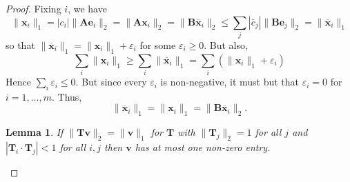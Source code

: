 \documentclass[journal, onecolumn]{IEEEtran}
\newtheorem{lemma}{Lemma}
\begin{document}
\begin{proof}
Fixing $i$, we have
\begin{equation}
\|\mathbf{x}_i\|_1 = |c_i| \|\mathbf{Ae}_i\|_2 = \|\mathbf{Ax}_i\|_2 = \|\mathbf{B \overline x}_i\|_2 \leq \sum_j |\bar c_j| \|\mathbf{Be}_j\|_2 = \|\mathbf{\overline x}_i\|_1
\end{equation}
so that $\|\mathbf{\overline x}_i\|_1 = \|\mathbf{x}_i\|_1 + \varepsilon_i$ for some $\varepsilon_i \geq 0$. But also,
\begin{equation}
\sum_i \|\mathbf{x}_i\|_1 \geq \sum_i \|\mathbf{\overline x}_i\|_1 = \sum_i \left( \|\mathbf{x}_i\|_1 + \varepsilon_i \right)
\end{equation}
Hence $\sum_i \varepsilon_i \leq 0$. But since every $\varepsilon_i$ is non-negative, it must but that $\varepsilon_i = 0$ for $i = 1, \ldots, m$. Thus,
\begin{equation}
\|\mathbf{\overline x}_i\|_1 = \|\mathbf{x}_i\|_1 =  \|\mathbf{B \overline x}_i\|_2.
\end{equation}

\begin{lemma}\label{lemma1}
If $\|\mathbf{Tv}\|_2 = \|\mathbf{v}\|_1$ for $\mathbf{T}$ with $\|\mathbf{T}_j\|_2 = 1$ for all $j$ and $|\mathbf{T}_i \cdot \mathbf{T}_j| < 1$ for all $i, j$ then $\mathbf{v}$ has at most one non-zero entry. 
\end{lemma}


\end{proof}
\end{document}
